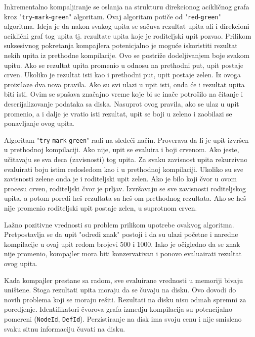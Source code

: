 Inkrementalno kompaljiranje se oslanja na strukturu direkcionog acikličnog grafa kroz "\verb|try|-\verb|mark|-\verb|green|" algoritam.
Ovaj algoritam potiče od "\verb|red|-\verb|green|" algoritma. Ideja je da nakon svakog upita se sačuva rezultat upita ali i direkcioni 
aciklični graf tog upita tj. rezultate upita koje je roditeljski upit pozvao. Prilikom suksesivnog pokretanja kompajlera potenicjalno 
je moguće iskoristiti rezultat nekih upita iz prethodne kompilacije. Ovo se postriže dodeljivanjem boje svakom upitu. Ako se rezultat 
upita promenio u odnosu na prethodni put, upit postaje crven. Ukoliko je rezultat isti kao i prethodni put, upit postaje zelen. 
Iz ovoga proizilaze dva nova pravila. Ako su svi ulazi u upit isti, onda će i rezultat upita biti isti. Ovim se spašava značajno vreme 
koje bi se inače potrošilo na čitanje i deserijalizovanje podataka sa diska. Nasuprot ovog pravila, ako se ulaz u upit promenio, 
a i dalje je vratio isti rezultat, upit se boji u zeleno i zaobilazi se ponavljanje ovog upita.

Algoritam "\verb|try|-\verb|mark|-\verb|green|" radi na sledeći način. Proverava da li je upit izvršen u prethodnoj kompilaciji. Ako 
nije, upit se evaluira i boji crvenom. Ako jeste, učitavaju se sva deca (zavisnosti) tog upita. Za svaku zavisnost upita rekurzivno 
evaluirati boju istim redosledom kao i u prethodnoj kompilaciji. Ukoliko su sve zavisnosti zelene onda je i roditeljski upit zelen.
Ako je bilo koji čvor u ovom procesu crven, roditeljski čvor je prljav. Izvršavaju se sve zavisnosti roditeljskog upita, a potom 
poredi heš rezultata sa heš-om prethodnog rezultata. Ako se heš nije promenio roditeljski upit postaje zelen, u suprotnom crven.

Lažno pozitivne vrednosti su problem prilikom upotrebe ovakvog algoritma. Pretpostavlja se da upit "odredi znak" postoji i da su 
ulazi početne i naredne kompilacije u ovaj upit redom brojevi 500 i 1000. Iako je očigledno da se znak nije promenio, kompajler 
mora biti konzervativan i ponovo evaluairati rezultat ovog upita.

Kada kompajler prestane sa radom, sve evaluirane vrednosti u memoriji bivaju uništene. Stoga rezultati upita moraju da se čuvaju 
na disku. Ovo dovodi do novih problema koji se moraju rešiti. Rezultati na disku nisu odmah spremni za poredjenje. Identifikatori 
čvorova grafa izmedju kompilacija su potencijalno pomereni (\verb|NodeId|, \verb|DefId|). Perzistiranje na disk ima svoju cenu i 
nije smisleno svaku sitnu informaciju čuvati na disku. 

